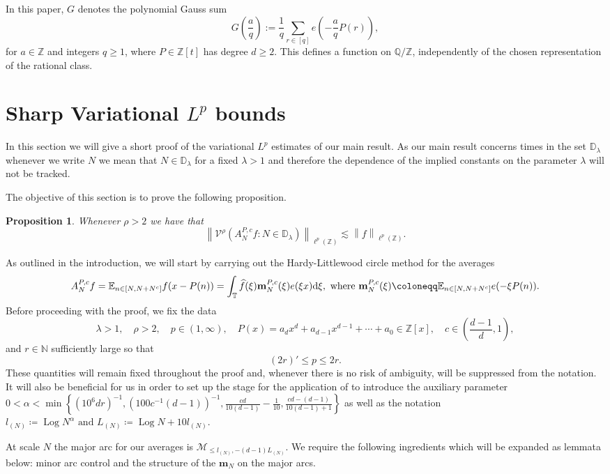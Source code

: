 \documentclass[12pt,leqno]{amsart}
\def\d{{\rm d}}
\def\N {\mathbb{N}}
\def\Z {{\mathbb Z}}
\newcommand{\TT}{\mathbb{ T} }
\newcounter{counter}
\newcounter{counter2}
\numberwithin{equation}{section}
\numberwithin{counter2}{section}
\newtheorem{proposition}[subsection]{Proposition}
\newcounter{theorem}
\theoremstyle{definition}
\theoremstyle{plain}
\newcommand{\EE}{\mathbb{E}}
\DeclareMathOperator{\Log}{Log}
\begin{document}
In this paper, $G$ denotes the polynomial Gauss sum
\[
G\left(\frac{a}{q}\right)
:=\frac{1}{q}\sum_{r\in[q]}
e\left(-\frac{a}{q}P(r)\right),
\]
for $a\in\Z$ and integers $q\geq1$, where $P\in\Z[t]$ has degree $d\geq2$. This defines a function on $\mathbb Q/\Z$, independently of the chosen representation of the rational class. 


	
	\section{Sharp Variational $L^p$ bounds}
    In this section we will give a short proof of the variational $L^p$ estimates of our main result. As our main result concerns times in the set $ \mathbb{D}_{\lambda}$ whenever we write $N$ we mean that $N \in \mathbb{D}_{\lambda}$ for a fixed $\lambda>1$ and therefore the dependence of the implied constants on the parameter $\lambda$ will not be tracked.
	
	The objective of this section is to prove the following proposition. \begin{proposition} \label{p:varintlp} Whenever $\rho>2$ we have that 
		\[ \left \| \mathcal{V}^\rho(A_N^{P,c}f: N \in \mathbb{D}_{\lambda}) \right \|_{\ell^p(\Z)} \lesssim \left \| f \right \|_{\ell^p(\Z)}. \]
	\end{proposition} As outlined in the introduction, we will start by carrying out the Hardy-Littlewood circle method for the averages \[A_{N}^{P,c}f=\EE_{n \in [N,N+N^c]}f(x-P(n))= \int_{\TT} \widehat{f}(\xi) \mathbf{m}_N^{P,c}(\xi)e(\xi x) \d \xi, \text{ where }\mathbf{m}_{N}^{P,c}(\xi) \coloneqq \EE_{n \in [N,N+N^c] }e(-\xi P(n)).   \] 
	Before proceeding with the proof, we fix the data
	\[
	\lambda>1, \quad \rho>2,\quad
	p\in(1,\infty),\quad
	P(x)=a_d x^d+a_{d-1}x^{d-1}+\cdots+a_0\in\mathbb{Z}[x],\quad
	c\in\left(\frac{d-1}{d},1\right),
	\]
	and  $r \in \N $ sufficiently large so that
	\[
	(2r)' \leq p \leq 2r.
	\]
	These quantities will remain fixed throughout the proof and, whenever there is no risk of ambiguity, will be suppressed from the notation. It will also be beneficial for us in order to set up the stage for the application of \cite[Theorem 5.2]{KMSZ26} to introduce the auxiliary parameter $0<\alpha<\min \left\{(10^6 dr)^{-1},  (100c^{-1}(d-1))^{-1},\frac{cd}{10(d-1)}-\frac{1}{10},\frac{cd-(d-1)}{10(d-1)+1} \right\}$ as well as the notation $	l_{(N)} \coloneqq \Log N^\alpha \text{ and }  L_{(N)} \coloneqq  \Log N+10l_{(N)}.$

	
	At scale $N$ the major arc for our averages is $\mathcal{M}_{\leq l_{(N)},-(d-1)L_{(N)}}.$ We require the following ingredients which will be expanded as lemmata below: minor arc control and the structure of the $\mathbf{m}_N$ on the major arcs. 
	
\end{document}
